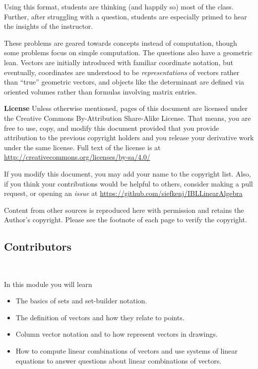 {Using this format, students are thinking (and happily so) most of the class. Further,
after struggling with a question, students are especially primed to hear the insights of the instructor.

These problems are geared towards concepts instead of computation, though some problems
focus on simple computation. The questions also have a geometric lean. Vectors are initially
introduced with familiar coordinate notation, but eventually, coordinates are understood to be
\emph{representations} of vectors rather than ``true'' geometric vectors, and objects like the
determinant are defined via oriented volumes rather than formulas involving matrix entries.

\bigskip
{\bf License} Unless otherwise mentioned, pages of this document are licensed under
the Creative Commons By-Attribution Share-Alike License. That means, you are free
to use, copy, and modify this document provided that you provide attribution to the
previous copyright holders and you release your derivative work under the same license.
Full text of the license is at \url{http://creativecommons.org/licenses/by-sa/4.0/}

If you modify this document, you may add your name to the copyright list. Also,
if you think your contributions would be helpful to others, consider making a
pull request, or opening an \emph{issue} at \url{https://github.com/siefkenj/IBLLinearAlgebra}

Content from other sources is reproduced here with permission and retains the
Author's copyright. Please see the footnote of each page to verify the
copyright.

\newpage
}

\begin{bookonly}
	
\section*{Contributors}

\newpage
	$\phantom{x}$
	\newpage
\end{bookonly}

\setcounter{page}{1}
\pagestyle{siefken}



\begin{module}

	In this module you will learn
	\begin{itemize}
		\item The basics of sets and set-builder notation.
		\item The definition of vectors and how they relate to points.
		\item Column vector notation and to how represent vectors in drawings.
		\item How to compute linear combinations of vectors and use systems of linear
			equations to answer questions about linear combinations of vectors.
	\end{itemize}

	
	
\end{module}

